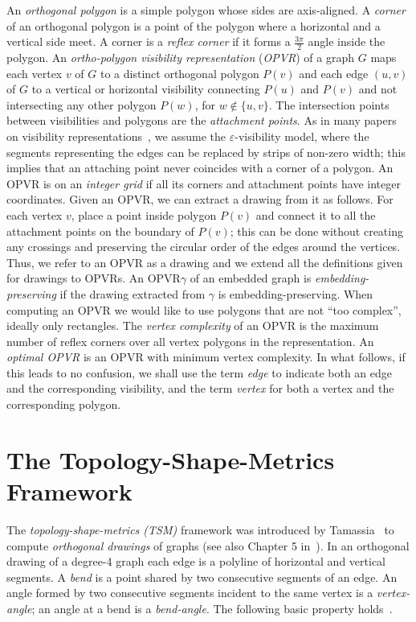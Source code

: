 \documentclass{article}
\newcommand{\pt}{\frac{3\pi}{2}}
\newcommand{\opvr}{OPVR\xspace}
\begin{document}
An \emph{orthogonal polygon} is a simple polygon whose sides are axis-aligned. A \emph{corner} of an orthogonal polygon is a point of the polygon where a horizontal and a vertical side meet. A corner is a \emph{reflex corner} if it forms a $\pt$ angle inside the polygon. An \emph{ortho-polygon visibility representation} (\emph{\opvr}) of a graph $G$ maps each vertex $v$ of $G$ to a distinct orthogonal polygon $P(v)$ and each edge $(u,v)$ of $G$ to a vertical or horizontal visibility connecting $P(u)$ and $P(v)$ and not intersecting any other polygon $P(w)$, for $w \not \in \{u,v\}$. The intersection points between visibilities and polygons are the \emph{attachment points}. As in many papers on visibility representations~\cite{DBLP:journals/ipl/KantLTT97,DBLP:conf/stacs/StreinuW03,TamassiaTollis86,DBLP:conf/compgeom/Wismath85}, we assume the $\varepsilon$-visibility model, where the segments representing the edges can be replaced by strips of non-zero width; this implies that an attaching point never coincides with a corner of a polygon. An \opvr is on an \emph{integer grid} if all its corners and attachment points have integer coordinates.
Given an \opvr, we can extract a drawing from it as follows. For each vertex $v$, place a point inside polygon $P(v)$ and connect it to all the attachment points on the boundary of $P(v)$; this can be done without creating any crossings and preserving the circular order of the edges around the vertices. Thus, we refer to an \opvr as a drawing and we extend all the definitions given for drawings to {\opvr}s. An \opvr $\gamma$ of an embedded graph is \emph{embedding-preserving} if the drawing extracted from $\gamma$ is embedding-preserving. 
When computing an \opvr we would like to use polygons that are not ``too complex'', ideally only rectangles. 
The \emph{vertex complexity} of an \opvr is the maximum number of reflex corners over all vertex polygons in the representation. An \emph{optimal \opvr} is an \opvr with minimum vertex complexity. In what follows, if this leads to no confusion, we shall use the term \emph{edge} to indicate both an edge and the corresponding visibility, and the term \emph{vertex} for both a vertex and the corresponding polygon.      

\section{The Topology-Shape-Metrics Framework}\label{se:tsm}

The \emph{topology-shape-metrics (TSM)} framework was introduced by Tamassia~\cite{t-eggmnb-87} to compute \emph{orthogonal drawings} of graphs (see also Chapter 5 in~\cite{dett-gdavg-99}). In an orthogonal drawing of a degree-4 graph each edge is a polyline of horizontal and vertical segments. A \emph{bend} is a point shared by two consecutive segments of an edge. An angle formed by two consecutive segments incident to the same vertex is a \emph{vertex-angle}; an angle at a bend is a \emph{bend-angle}. The following basic property holds~\cite{dett-gdavg-99}.
\end{document}
